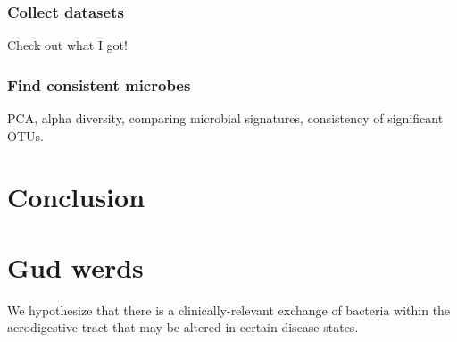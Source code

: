 \documentclass[12pt]{article}
\begin{document}
\subsubsection{Collect datasets}
Check out what I got!

\subsubsection{Find consistent microbes}
PCA, alpha diversity, comparing microbial signatures, consistency of significant OTUs.

\section{Conclusion}

\section{Gud werds}
We hypothesize that there is a clinically-relevant exchange of bacteria within the aerodigestive tract that may be altered in certain disease states. 
\end{document}
